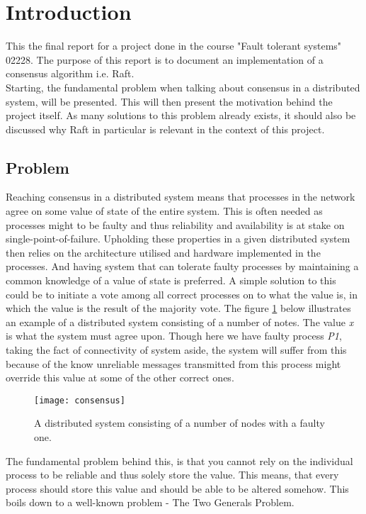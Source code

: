 \section{Introduction}
This the final report for a project done in the course "Fault tolerant systems" 02228. The purpose of this report is to document an implementation of a consensus algorithm i.e. Raft. \\
Starting, the fundamental problem when talking about consensus in a distributed system, will be presented. This will then present the motivation behind the project itself. As many solutions to this problem already exists, it should also be discussed why Raft in particular is relevant in the context of this project.

\subsection{Problem}
Reaching consensus in a distributed system means that processes in the network agree on some value of state of the entire system. This is often needed as processes might to be faulty and thus reliability and availability is at stake on single-point-of-failure. Upholding these properties in a given distributed system then relies on the architecture utilised and hardware implemented in the processes. And having system that can tolerate faulty processes by maintaining a common knowledge of a value of state is preferred. A simple solution to this could be to initiate a vote among all correct processes on to what the value is, in which the value is the result of the majority vote. The figure \ref{consensus} below illustrates an example of a distributed system consisting of a number of notes. The value \textit{x} is what the system must agree upon. Though here we have faulty process \textit{P1}, taking the fact of connectivity of system aside, the system will suffer from this because of the know unreliable messages transmitted from this process might override this value at some of the other correct ones. \\
\begin{figure}[h]
	\centering
	\texttt{[image: consensus]}
	\caption{A distributed system consisting of a number of nodes with a faulty one.}
	\label{consensus}
\end{figure}
The fundamental problem behind this, is that you cannot rely on the individual process to be reliable and thus solely store the value. This means, that every process should store this value and should be able to be altered somehow. This boils down to a well-known problem - The Two Generals Problem.
